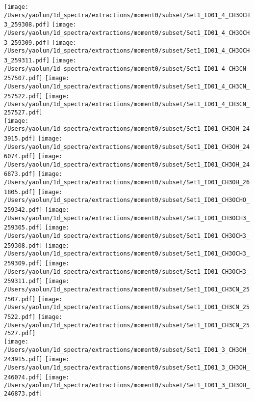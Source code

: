 \begin{figure*}[htbp!]
  \texttt{[image: /Users/yaolun/1d\_spectra/extractions/moment0/subset/Set1\_ID01\_4\_CH3OCH3\_259308.pdf]}
  \texttt{[image: /Users/yaolun/1d\_spectra/extractions/moment0/subset/Set1\_ID01\_4\_CH3OCH3\_259309.pdf]}
  \texttt{[image: /Users/yaolun/1d\_spectra/extractions/moment0/subset/Set1\_ID01\_4\_CH3OCH3\_259311.pdf]}
  \texttt{[image: /Users/yaolun/1d\_spectra/extractions/moment0/subset/Set1\_ID01\_4\_CH3CN\_257507.pdf]}
  \texttt{[image: /Users/yaolun/1d\_spectra/extractions/moment0/subset/Set1\_ID01\_4\_CH3CN\_257522.pdf]}
  \texttt{[image: /Users/yaolun/1d\_spectra/extractions/moment0/subset/Set1\_ID01\_4\_CH3CN\_257527.pdf]}
  \\
  \texttt{[image: /Users/yaolun/1d\_spectra/extractions/moment0/subset/Set1\_ID01\_CH3OH\_243915.pdf]}
  \texttt{[image: /Users/yaolun/1d\_spectra/extractions/moment0/subset/Set1\_ID01\_CH3OH\_246074.pdf]}
  \texttt{[image: /Users/yaolun/1d\_spectra/extractions/moment0/subset/Set1\_ID01\_CH3OH\_246873.pdf]}
  \texttt{[image: /Users/yaolun/1d\_spectra/extractions/moment0/subset/Set1\_ID01\_CH3OH\_261805.pdf]}
  \texttt{[image: /Users/yaolun/1d\_spectra/extractions/moment0/subset/Set1\_ID01\_CH3OCHO\_259342.pdf]}
  \texttt{[image: /Users/yaolun/1d\_spectra/extractions/moment0/subset/Set1\_ID01\_CH3OCH3\_259305.pdf]}
  \texttt{[image: /Users/yaolun/1d\_spectra/extractions/moment0/subset/Set1\_ID01\_CH3OCH3\_259308.pdf]}
  \texttt{[image: /Users/yaolun/1d\_spectra/extractions/moment0/subset/Set1\_ID01\_CH3OCH3\_259309.pdf]}
  \texttt{[image: /Users/yaolun/1d\_spectra/extractions/moment0/subset/Set1\_ID01\_CH3OCH3\_259311.pdf]}
  \texttt{[image: /Users/yaolun/1d\_spectra/extractions/moment0/subset/Set1\_ID01\_CH3CN\_257507.pdf]}
  \texttt{[image: /Users/yaolun/1d\_spectra/extractions/moment0/subset/Set1\_ID01\_CH3CN\_257522.pdf]}
  \texttt{[image: /Users/yaolun/1d\_spectra/extractions/moment0/subset/Set1\_ID01\_CH3CN\_257527.pdf]}
  \\
  \texttt{[image: /Users/yaolun/1d\_spectra/extractions/moment0/subset/Set1\_ID01\_3\_CH3OH\_243915.pdf]}
  \texttt{[image: /Users/yaolun/1d\_spectra/extractions/moment0/subset/Set1\_ID01\_3\_CH3OH\_246074.pdf]}
  \texttt{[image: /Users/yaolun/1d\_spectra/extractions/moment0/subset/Set1\_ID01\_3\_CH3OH\_246873.pdf]}

\end{figure*}
